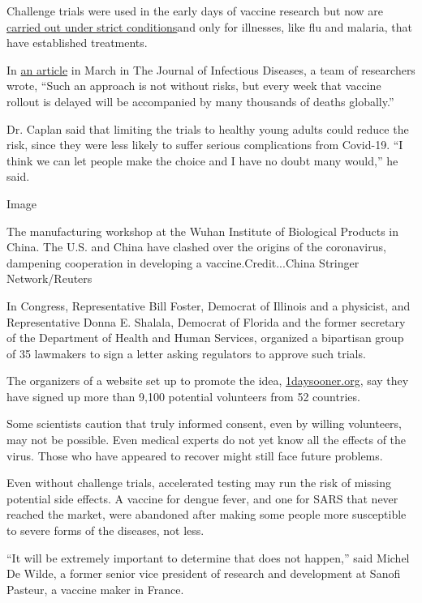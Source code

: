 Challenge trials were used in the early days of vaccine research but now
are
\href{https://www.nytimes.com/2020/04/30/opinion/coronavirus-vaccine-covid.html}{carried
out under strict conditions}and only for illnesses, like flu and
malaria, that have established treatments.

In
\href{https://dash.harvard.edu/bitstream/handle/1/42639016/jiaa152.pdf?sequence=4\&isAllowed=y}{an
article} in March in The Journal of Infectious Diseases, a team of
researchers wrote, ``Such an approach is not without risks, but every
week that vaccine rollout is delayed will be accompanied by many
thousands of deaths globally.''

Dr. Caplan said that limiting the trials to healthy young adults could
reduce the risk, since they were less likely to suffer serious
complications from Covid-19. ``I think we can let people make the choice
and I have no doubt many would,'' he said.

Image

The manufacturing workshop at the Wuhan Institute of Biological Products
in China. The U.S. and China have clashed over the origins of the
coronavirus, dampening cooperation in developing a
vaccine.Credit...China Stringer Network/Reuters

In Congress, Representative Bill Foster, Democrat of Illinois and a
physicist, and Representative Donna E. Shalala, Democrat of Florida and
the former secretary of the Department of Health and Human Services,
organized a bipartisan group of 35 lawmakers to sign a letter asking
regulators to approve such trials.

The organizers of a website set up to promote the idea,
\href{https://1daysooner.org/}{1daysooner.org}, say they have signed up
more than 9,100 potential volunteers from 52 countries.

Some scientists caution that truly informed consent, even by willing
volunteers, may not be possible. Even medical experts do not yet know
all the effects of the virus. Those who have appeared to recover might
still face future problems.

Even without challenge trials, accelerated testing may run the risk of
missing potential side effects. A vaccine for dengue fever, and one for
SARS that never reached the market, were abandoned after making some
people more susceptible to severe forms of the diseases, not less.

``It will be extremely important to determine that does not happen,''
said Michel De Wilde, a former senior vice president of research and
development at Sanofi Pasteur, a vaccine maker in France.

